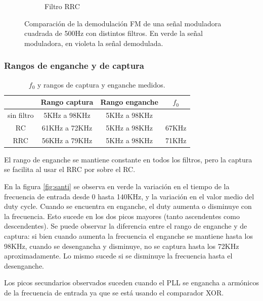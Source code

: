 \documentclass[../../tc_tp6_main.tex]{subfiles}
\begin{document}
\begin{figure}[H]
\begin{subfigure}[t]{0.45\textwidth}
		\caption{Filtro RRC}
		\label{fig:fm_rrc_sq_500_demod}
	\end{subfigure}
	\caption{Comparaci\'on de la demodulaci\'on FM de una se\~nal moduladora cuadrada de 500Hz con distintos filtros. En verde la se\~nal moduladora, en violeta la se\~nal demodulada.}
	\label{fig:fm_sq_500}
\end{figure}

\subsubsection{Rangos de enganche y de captura}

\begin{table}[H]
	\centering
	\begin{tabular}{|c|c|c|c|}
		\hline 
			& Rango captura & Rango enganche & $f_0$ \\ 
		\hline 
		sin filtro & 5KHz a 98KHz & 5KHz a 98KHz &  \\ 
		\hline 
		RC & 61KHz a 72KHz & 5KHz a 98KHz & 67KHz \\ 
		\hline 
		RRC & 56KHz a 79KHz & 5KHz a 98KHz & 71KHz \\ 
		\hline 
	\end{tabular}
	\caption{$f_0$ y rangos de captura y enganche medidos.}
	\label{tab:ej2_rangos}
\end{table}

El rango de enganche se mantiene constante en todos los filtros, pero la captura se facilita al usar el RRC por sobre el RC. \par 
En la figura \ref{fig:santi} se observa en verde la variaci\'on en el tiempo de la frecuencia de entrada desde 0 hasta 140KHz, y la variaci\'on en el valor medio del duty cycle. Cuando se encuentra en enganche, el duty aumenta o disminuye con la frecuencia. Esto sucede en los dos picos mayores (tanto ascendentes como descendentes). Se puede observar la diferencia entre el rango de enganche y de captura: si bien cuando aumenta la frecuencia el enganche se mantiene hasta los 98KHz, cuando se desengancha y disminuye, no se captura hasta los 72KHz aproximadamente. Lo mismo sucede si se disminuye la frecuencia hasta el desenganche.\par
Los picos secundarios observados suceden cuando el PLL se engancha a arm\'onicos de la frecuencia de entrada ya que se est\'a usando el comparador XOR.
\end{document}
